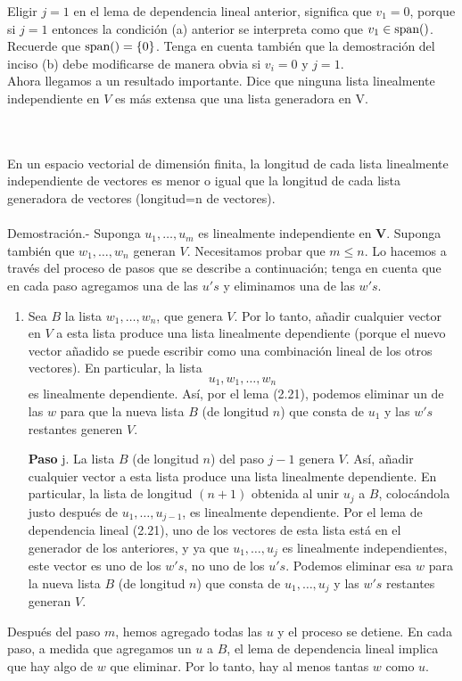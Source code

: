 Eligir $j=1$ en el lema de dependencia lineal anterior, significa que $v_1=0$, porque si $j=1$ entonces la condición (a) anterior se interpreta como que $v_1\in \mathop{\mbox{\normalfont span}}\nolimits()$. Recuerde que $\mathop{\mbox{\normalfont span}}\nolimits()=\left\{0\right\}$. Tenga en cuenta también que la demostración del inciso (b) debe modificarse de manera obvia si $v_i=0$ y $j=1$.\\

Ahora llegamos a un resultado importante. Dice que ninguna lista linealmente independiente en $V$ es más extensa que una lista generadora en V.

\setcounter{myteo}{22}
\begin{myteo}\;\\\\
    En un espacio vectorial de dimensión finita, la longitud de cada lista linealmente independiente de vectores es menor o igual que la longitud de cada lista generadora de vectores (longitud=n de vectores).\\\\ 
    Demostración.-\; Suponga $u_1,\ldots,u_m$ es linealmente independiente en $\textbf{V}$. Suponga también que $w_1,\ldots,w_n$ generan $V$. Necesitamos probar que $m\leq n$. Lo hacemos a través del proceso de pasos que se describe a continuación; tenga en cuenta que en cada paso agregamos una de las $u's$ y eliminamos una de las $w's$.

    \begin{enumerate}
	\item Sea $B$ la lista $w_1,\ldots,w_n$, que genera $V$. Por lo tanto, añadir cualquier vector en $V$ a esta lista produce una lista linealmente dependiente (porque el nuevo vector añadido se puede escribir como una combinación lineal de los otros vectores). En particular, la lista
	$$u_1,w_1,\ldots,w_n$$
	es linealmente dependiente. Así, por el lema (2.21), podemos eliminar un de las $w$ para que la nueva lista $B$ (de longitud $n$) que consta de $u_1$ y las $w's$ restantes generen $V$.
	\item[\textbf{Paso} j.] La lista $B$ (de longitud $n$) del paso $j-1$ genera $V$. Así, añadir cualquier vector a esta lista produce una lista linealmente dependiente. En particular, la lista de longitud $(n+1)$ obtenida al unir $u_j$ a $B$, colocándola justo después de $u_1,\ldots,u_{j-1}$, es linealmente dependiente. Por el lema de dependencia lineal (2.21), uno de los vectores de esta lista está en el generador de los anteriores, y ya que $u_1,\ldots,u_j$ es linealmente independientes, este vector es uno de los $w's$, no uno de los $u's$. Podemos eliminar esa $w$ para la nueva lista $B$ (de longitud $n$) que consta de $u_1,\ldots,u_j$ y las $w's$ restantes generan $V$.
    \end{enumerate}
    Después del paso $m$, hemos agregado todas las $u$ y el proceso se detiene. En cada paso, a medida que agregamos un $u$ a $B$, el lema de dependencia lineal implica que hay algo de $w$ que eliminar. Por lo tanto, hay al menos tantas $w$ como $u$.
\end{myteo}

